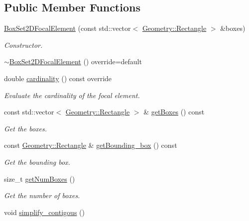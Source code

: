 \subsection*{Public Member Functions}
\begin{DoxyCompactItemize}
\item 
\hyperlink{classBoxSet2DFocalElement_a8215ede5350376e541893ce73d8e5a05}{Box\+Set2\+D\+Focal\+Element} (const std\+::vector$<$ \hyperlink{classGeometry_1_1Rectangle}{Geometry\+::\+Rectangle} $>$ \&boxes)
\begin{DoxyCompactList}\small\item\em Constructor. \end{DoxyCompactList}\item 
\hyperlink{classBoxSet2DFocalElement_aca7b4a88ffdd6b3d1e8b688c4f2e13ba}{$\sim$\+Box\+Set2\+D\+Focal\+Element} () override=default
\item 
double \hyperlink{classBoxSet2DFocalElement_a65dd4942ec406f9048432654f81df964}{cardinality} () const override
\begin{DoxyCompactList}\small\item\em Evaluate the cardinality of the focal element. \end{DoxyCompactList}\item 
const std\+::vector$<$ \hyperlink{classGeometry_1_1Rectangle}{Geometry\+::\+Rectangle} $>$ \& \hyperlink{classBoxSet2DFocalElement_a21707f3b23e1d1b72db05ccfae023634}{get\+Boxes} () const 
\begin{DoxyCompactList}\small\item\em Get the boxes. \end{DoxyCompactList}\item 
const \hyperlink{classGeometry_1_1Rectangle}{Geometry\+::\+Rectangle} \& \hyperlink{classBoxSet2DFocalElement_a431361485288f14e2770aab9d12a1320}{get\+Bounding\+\_\+box} () const 
\begin{DoxyCompactList}\small\item\em Get the bounding box. \end{DoxyCompactList}\item 
size\+\_\+t \hyperlink{classBoxSet2DFocalElement_aea0ef3a8e8f6e64e1305400771590749}{get\+Num\+Boxes} ()
\begin{DoxyCompactList}\small\item\em Get the number of boxes. \end{DoxyCompactList}\item 
void \hyperlink{classBoxSet2DFocalElement_a48eaa6fae893da98034ea1359bb6a6da}{simplify\+\_\+contigous} ()

\end{DoxyCompactItemize}
